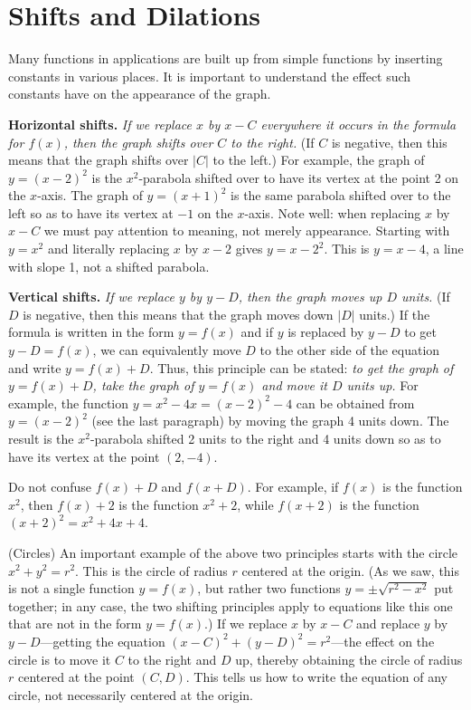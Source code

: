 \section{Shifts and Dilations}{}{}

Many functions in applications are built up from simple functions by
inserting constants in various places.  It is important to understand
the effect such constants have on the appearance of the graph.

\ssk\noindent
{\bf Horizontal shifts.} {\it If we replace $x$ by $x-C$ everywhere it
occurs in the formula for $f(x)$, then the graph shifts over $C$ to the
right.} (If $C$ is negative, then this means that the graph shifts over
$|C|$ to the left.)  For example, the graph of $y=(x-2)^2$ is the
$x^2$-parabola shifted over to have its vertex at the point 2 on the
$x$-axis.  The graph of $y=(x+1)^2$ is the same parabola shifted over to
the left so as to have its vertex at $-1$ on the $x$-axis. Note well:
when replacing $x$ by $x-C$ we must pay attention to meaning, not
merely appearance. Starting with $y=x^2$ and literally replacing $x$
by $x-2$ gives $y=x-2^2$. This is $y=x-4$, a line with slope 1, not a
shifted parabola.

\ssk\noindent
{\bf Vertical shifts.} {\it If we replace $y$ by $y-D$, then the graph
moves up $D$ units.}  (If $D$ is negative, then this means that the graph
moves down $|D|$ units.)  If the formula is written in the form
$y=f(x)$ and if $y$ is replaced by $y-D$ to get $y-D=f(x)$, we can
equivalently move $D$ to the other side of the equation and write
$y=f(x)+D$.  Thus, this principle can be stated: {\it to get the
graph of $y=f(x)+D$, take the graph of $y=f(x)$ and move it $D$ units up.}
For example, the function $y=x^2-4x=(x-2)^2-4$ can be obtained from
$y=(x-2)^2$ (see the last paragraph) by moving the graph 4 units down.
The result is the $x^2$-parabola shifted 2 units to the right and 4 units
down so as to have its vertex at the point $(2,-4)$.

\begin{warning}
Do not confuse $f(x)+D$ and $f(x+D)$.  For example, if $f(x)$ is the
function $x^2$, then $f(x)+2$ is the function $x^2+2$, while $f(x+2)$
is the function $(x+2)^2=x^2+4x+4$.
\end{warning}

\begin{example} (Circles) An important example of the above two principles
starts with the circle $x^2+y^2=r^2$.  This is the circle of radius
$r$ centered at the origin.  (As we saw, this is not a single function
$y=f(x)$, but rather two functions $y=\pm\sqrt{r^2-x^2}$ put together;
in any case, the two shifting principles apply to equations like this
one that are not in the form $y=f(x)$.)  If we replace $x$
by $x-C$ and replace $y$ by $y-D$---getting the equation
$(x-C)^2+(y-D)^2=r^2$---the effect on the circle is to move it $C$ to
the right and $D$ up, thereby obtaining the circle of radius $r$
centered at the point $(C,D)$.  This tells us how to write the
equation of any circle, not necessarily centered at the origin.
\end{example}

